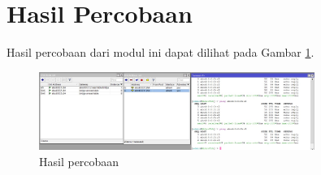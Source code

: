 \section*{Hasil Percobaan} %

Hasil percobaan dari modul ini dapat dilihat pada Gambar \ref{fig:hasilpercobaan}.

\begin{figure}[H]
    \centering
    \includegraphics[width=0.8\textwidth]{img/Hasil akhir.jpeg}
    \caption{Hasil percobaan}
    \label{fig:hasilpercobaan}
\end{figure}